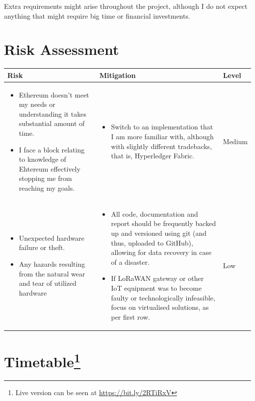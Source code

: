 \documentclass[a4paper,12pt]{article}
\begin{document}
Extra requirements might arise throughout the project, although I do not expect anything that might require big time or financial investments.

\section*{Risk Assessment}

\bgroup
\def\arraystretch{2}
\begin{table}[H]
\centering
\begin{tabular}{|m{}|m{}|m{}|}
\hline
\textbf{Risk} & \textbf{Mitigation}                       & \textbf{Level} \\ \hline
\begin{itemize}[leftmargin=*]
  \item Ethereum doesn't meet my needs or understanding it takes substantial amount of time.
  \item I face a block relating to knowledge of Ehtereum effectively stopping me from reaching my goals.
\end{itemize} &
\begin{itemize}[leftmargin=*]
  \item Switch to an implementation that I am more familiar with, although with slightly different tradebacks, that is, Hyperledger Fabric.
\end{itemize} &
Medium \\ \hline
\begin{itemize}[leftmargin=*]
  \item Unexpected hardware failure or theft.
  \item Any hazards resulting from the natural wear and tear of utilized hardware
\end{itemize} &
\begin{itemize}[leftmargin=*]
  \item All code, documentation and report should be frequently backed up and versioned using git (and thus, uploaded to GitHub), allowing for data recovery in case of a disaster.
  \item If LoRaWAN gateway or other IoT equipment was to become faulty or technologically infeasible, focus on virtualised solutions, as per first row.
\end{itemize} &
Low \\ \hline
\end{tabular}
\end{table}
\egroup
\pagebreak
\section*{Timetable\footnote{Live version can be seen at \url{https://bit.ly/2RTiRxV}}}
\end{document}
